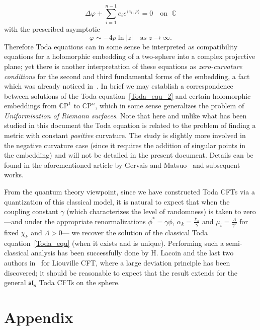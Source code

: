 \documentclass[10pt]{amsart}
\theoremstyle{definition}\newtheorem{defi}[theo]{Definition}\newtheorem{rema}[theo]{Remark}\newtheorem{exam}[theo]{Example}\newtheorem{exem}[theo]{Example}\newtheorem{nota}[theo]{Notation}
\newcommand{\frksl}{\mathfrak{sl}}
\newcommand{\rmP}{\mathrm{P}}
\newcommand{\C}{\mathbb{C}}
\newcommand{\ps}[1]{\langle #1 \rangle}
\newcommand{\norm}[1]{\left\lvert#1\right\rvert}
\begin{document}
\begin{equation}\label{Toda_equ_2}
\Delta\varphi+\sum_{i=1}^{n-1}e_ie^{\ps{e_i,\varphi}}=0 \quad\text{on }\;\C
\end{equation}
with the prescribed asymptotic
\begin{equation}
\varphi\sim-4\rho\ln\norm{z}\quad\text{as }z\to\infty.
\end{equation}
Therefore Toda equations can in some sense be interpreted as compatibility equations for a holomorphic embedding of a two-sphere into a complex projective plane; yet there is another interpretation of these equations as \emph{zero-curvature conditions} for the second and third fundamental forms of the embedding, a fact which was already noticed in~\cite{LS79}. In brief we may establish a correspondence between solutions of the Toda equation~\eqref{Toda_equ_2} and certain holomorphic embeddings from $\C\rmP^1$ to $\C\rmP^n$, which in some sense generalizes the problem of \emph{Uniformisation of Riemann surfaces}. Note that here and unlike what has been studied in this document the Toda equation is related to the problem of finding a metric with constant \emph{positive} curvature. The study is slightly more involved in the negative curvature case (since it requires the addition of singular points in the embedding) and will not be detailed in the present document. Details can be found in the aforementioned article by Gervais and Matsuo~\cite{GeMa92} and subsequent works.

From the quantum theory viewpoint, since we have constructed Toda CFTs via a quantization of this classical model, it is natural to expect that when the coupling constant $\gamma$ (which characterizes the level of randomness) is taken to zero ---and under the appropriate renormalizations $\phi^*=\gamma\phi$, $\alpha_k=\frac{\chi_k}{\gamma}$ and $\mu_i=\frac{\Lambda}{\gamma^2}$ for fixed $\chi_k$ and $\Lambda>0$--- we recover the solution of the classical Toda equation~\eqref{Toda_equ} (when it exists and is unique). Performing such a semi-classical analysis has been successfully done by H. Lacoin and the last two authors in~\cite{LRV19} for Liouville CFT, where a large deviation principle has been discovered; it should be reasonable to expect that the result extends for the general $\frksl_n$ Toda CFTs on the sphere.



\section{Appendix}
\end{document}
